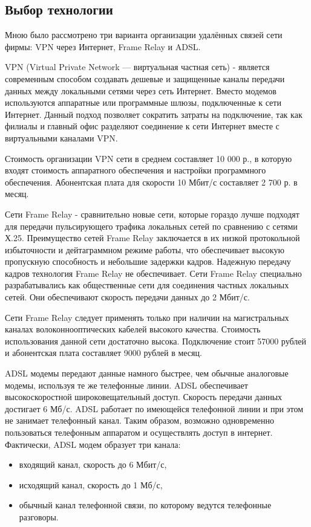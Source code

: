 \documentclass[russian,utf8,emptystyle]{eskdtext}
\begin{document}
\subsection{Выбор технологии}
Мною было рассмотрено три варианта организации удалённых связей сети фирмы: VPN через Интернет, Frame Relay и ADSL.

VPN (Virtual Private Network — виртуальная частная сеть) - является современным способом создавать дешевые и защищенные каналы передачи данных между локальными сетями через сеть Интернет. Вместо модемов используются аппаратные или программные шлюзы, подключенные к сети Интернет. Данный подход позволяет сократить затраты на подключение, так как филиалы и главный офис разделяют соединение к сети Интернет вместе с виртуальными каналами VPN.

Стоимость организации VPN сети в среднем составляет 10 000 р., в которую входят стоимость аппаратного обеспечения и настройки программного обеспечения. Абонентская плата для скорости 10 Мбит/с составляет 2 700 р. в месяц.

Сети Frame Relay - сравнительно новые сети, которые гораздо лучше подходят для передачи пульсирующего трафика локальных сетей по сравнению с сетями Х.25. Преимущество сетей Frame Relay заключается в их низкой протокольной избыточности и дейтаграммном режиме работы, что обеспечивает высокую пропускную способность и небольшие задержки кадров. Надежную передачу кадров технология Frame Relay не обеспечивает. Сети Frame Relay специально разрабатывались как общественные сети для соединения частных локальных сетей. Они обеспечивают скорость передачи данных до 2 Мбит/с.

Сети Frame Relay следует применять только при наличии на магистральных каналах волоконнооптических кабелей высокого качества. Стоимость использования данной сети достаточно высока. Подключение стоит 57000 рублей и абонентская плата составляет 9000 рублей в месяц.

ADSL модемы передают данные намного быстрее, чем обычные аналоговые модемы, используя те же телефонные линии. ADSL обеспечивает высокоскоростной широковещательный доступ. Скорость передачи данных достигает 6 Мб/с. ADSL работает по имеющейся телефонной
линии и при этом не занимает телефонный канал. Таким образом, возможно одновременно пользоваться телефонным аппаратом и осуществлять доступ в интернет. Фактически, ADSL модем образует три канала:
\begin{itemize}[label=-]
\item входящий канал, скорость до 6 Мбит/с,
\item исходящий канал, скорость до 1 Мб/с,
\item обычный канал телефонной связи, по которому ведутся телефонные разговоры.
\end{itemize}
\end{document}
